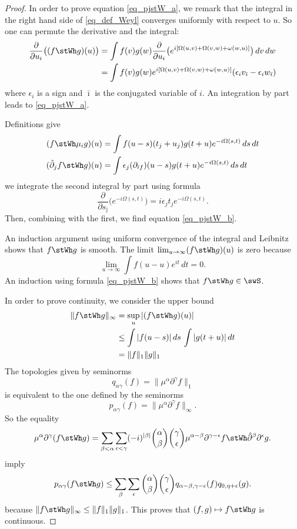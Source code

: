 \begin{proof}
In order to prove equation \eqref{eq_pjstW_a}, we remark that the integral in the right hand side of \eqref{eq_def_Weyl} converges uniformly with respect to $u$. So one can permute the derivative and the integral:
\[
 \begin{split}
  \frac{ \partial }{ \partial u_i }\big( (f\stWh g)(u) \big)&=\int f(v)g(w)\frac{ \partial }{ \partial u_i }\big( e^{i[\Omega(u,v)+\Omega(v,w)+\omega(w,u)]} \big)\,dv\,dw\\
		&=\int f(v)g(w)e^{i[\Omega(u,v)+\Omega(v,w)+\omega(w,u)]}(\epsilon_i v_{\bar\imath}-\epsilon_i w_{\bar\imath})
\end{split}
\]
where $\epsilon_i$ is a sign and $\bar\imath$ is the conjugated variable of $i$. An integration by part leads to \eqref{eq_pjstW_a}.

Definitions give
\begin{subequations}
\begin{align}
  (f\stWh \mu_ig)(u)&=\int f(u-s)(t_j+u_j)g(t+u)e^{-i\Omega(s,t)}\,ds\,dt\\
 (\hat\partial_jf\stWh g)(u)&=\int \epsilon_j(\partial_{\bar\imath f})(u-s)g(t+u)e^{-i\Omega(s,t)}\,ds\,dt
\end{align}
\end{subequations}
we integrate the second integral by part using formula
\[
  \frac{ \partial }{ \partial s_{\bar\jmath} }\big( e^{-i\Omega(s,t)} \big)=i\epsilon_jt_je^{-i\Omega(s,t)}.
\]
Then, combining with the first, we find equation \eqref{eq_pjstW_b}.

An induction argument using uniform convergence of the integral and Leibnitz shows that $f\stWh g$ is smooth. The limit $\lim_{u\to\infty}(f\stWh g)(u)$ is zero because
\[
  \lim_{u\to\infty}\int f(u-u)e^{it}\,dt=0.
\]
An induction using formula  \eqref{eq_pjstW_b} shows that $f\stWh g\in\swS$.

In order to prove continuity, we consider the upper bound
\begin{equation}
\begin{split}
  \| f\stWh g \|_{\infty}&=\sup_u| (f\stWh g)(u) |\\
		&\leq \int | f(u-s) |\,ds\,\int | g(t+u) |\,dt\\
		&=\| f \|_1\| g \|_1
\end{split}
\end{equation}
The topologies given by seminorms
\[
  q_{\alpha\gamma}(f)=\| \mu^{\alpha}\partial^{\gamma}f \|_1
\]
is equivalent to the one defined by the seminorms
\[
  p_{\alpha\gamma}(f)=\| \mu^{\alpha}\partial^{\gamma}f \|_{\infty}.
\]
So the equality
\[
  \mu^{\alpha}\partial^{\gamma}(f\stWh g)=\sum_{\beta<\alpha}\sum_{\epsilon<\gamma}(-i)^{| \beta |}\binom{\alpha}{\beta}\binom{\gamma}{\epsilon}\mu^{\alpha-\beta}\partial^{\gamma-\epsilon}f\stWh \hat\partial^{\beta}\partial^{\epsilon}g.
\]
imply
\[
  p_{\alpha\gamma}(f\stWh g)\leq\sum_{\beta}\sum_{\epsilon} \binom{\alpha}{\beta}\binom{\gamma}{\epsilon}q_{\alpha-\beta,\gamma-\epsilon}(f)q_{0,\eta+\epsilon}(g).
\]
because $\| f\stWh g \|_{\infty}\leq\| f \|_1\| g \|_1$. This proves that $(f,g)\mapsto f\stWh g$ is continuous.


\end{proof}
